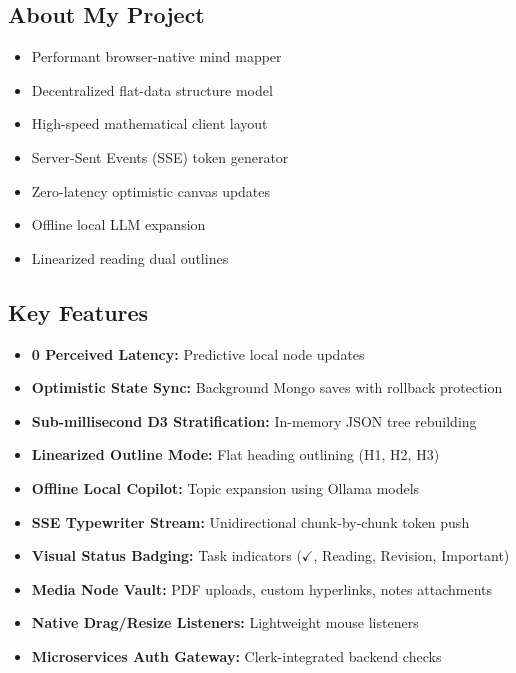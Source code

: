 \documentclass[12pt, a4paper]{article}
\begin{document}
\subsection{About My Project}
\begin{itemize}[label=\small$\bullet$, leftmargin=15pt, nosep]
  \item Performant browser-native mind mapper
  \item Decentralized flat-data structure model
  \item High-speed mathematical client layout
  \item Server-Sent Events (SSE) token generator
  \item Zero-latency optimistic canvas updates
  \item Offline local LLM expansion
  \item Linearized reading dual outlines
\end{itemize}

\subsection{Key Features}
\begin{itemize}[label=\small$\bullet$, leftmargin=15pt, nosep]
  \item \textbf{0 Perceived Latency:} Predictive local node updates
  \item \textbf{Optimistic State Sync:} Background Mongo saves with rollback protection
  \item \textbf{Sub-millisecond D3 Stratification:} In-memory JSON tree rebuilding
  \item \textbf{Linearized Outline Mode:} Flat heading outlining (H1, H2, H3)
  \item \textbf{Offline Local Copilot:} Topic expansion using Ollama models
  \item \textbf{SSE Typewriter Stream:} Unidirectional chunk-by-chunk token push
  \item \textbf{Visual Status Badging:} Task indicators ($\checkmark$, Reading, Revision, Important)
  \item \textbf{Media Node Vault:} PDF uploads, custom hyperlinks, notes attachments
  \item \textbf{Native Drag/Resize Listeners:} Lightweight mouse listeners
  \item \textbf{Microservices Auth Gateway:} Clerk-integrated backend checks
\end{itemize}
\end{document}
